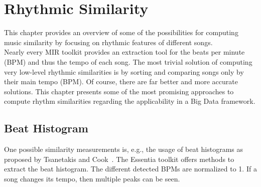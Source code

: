 \section{Rhythmic Similarity}\label{rhythmsimc}

This chapter provides an overview of some of the possibilities for computing music similarity by focusing on rhythmic features of different songs. \\
Nearly every MIR toolkit provides an extraction tool for the beats per minute (BPM) and thus the tempo of each song. The most trivial solution of computing very low-level rhythmic similarities is by sorting and comparing songs only by their main tempo (BPM). Of course, there are far better and more accurate solutions.
This chapter presents some of the most promising approaches to compute rhythm similarities regarding the applicability in a Big Data framework.\\

\subsection{Beat Histogram}\label{beathist}

One possible similarity measurements is, e.g., the usage of beat histograms as proposed by Tsanetakis and Cook~\cite{rhythm3}. The Essentia toolkit offers methods to extract the beat histogram. The different detected BPMs are normalized to 1. If a song changes its tempo, then multiple peaks can be seen.\\ 

